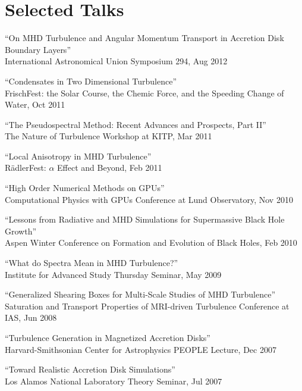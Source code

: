 \section*{Selected Talks}

\begin{ilist}

\item ``On MHD Turbulence and Angular Momentum Transport in Accretion Disk Boundary Layers''\\
  International Astronomical Union Symposium 294, Aug 2012

\item ``Condensates in Two Dimensional Turbulence''\\
  FrischFest: the Solar Course, the Chemic Force, and the Speeding Change of Water, Oct 2011

\item ``The Pseudospectral Method: Recent Advances and Prospects, Part II''\\
  The Nature of Turbulence Workshop at KITP, Mar 2011

\item ``Local Anisotropy in MHD Turbulence''\\
  R{\"a}dlerFest: $\alpha$ Effect and Beyond, Feb 2011

\item ``High Order Numerical Methods on GPUs''\\
  Computational Physics with GPUs Conference at Lund Observatory, Nov 2010

\item ``Lessons from Radiative and MHD Simulations for Supermassive Black Hole Growth''\\
  Aspen Winter Conference on Formation and Evolution of Black Holes, Feb 2010

\item ``What do Spectra Mean in MHD Turbulence?''\\
  Institute for Advanced Study Thursday Seminar, May 2009

\item ``Generalized Shearing Boxes for Multi-Scale Studies of MHD Turbulence''\\
  Saturation and Transport Properties of MRI-driven Turbulence Conference at IAS, Jun 2008

\item ``Turbulence Generation in Magnetized Accretion Disks''\\
  Harvard-Smithsonian Center for Astrophysics PEOPLE Lecture, Dec 2007

\item ``Toward Realistic Accretion Disk Simulations''\\
  Los Alamos National Laboratory Theory Seminar, Jul 2007

\end{ilist}
